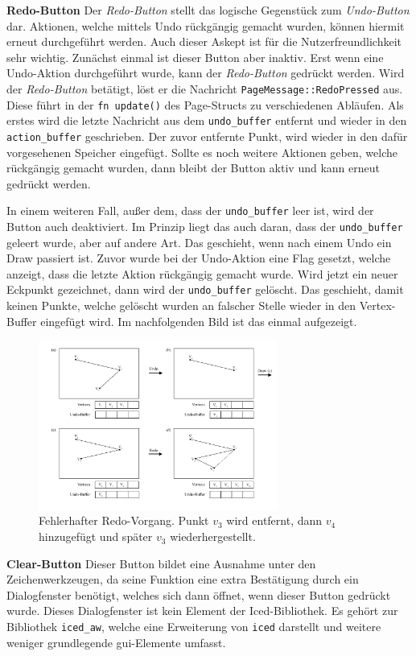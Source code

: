 \textbf{\small{Redo-Button}}\linebreak
Der \emph{Redo-Button} stellt das logische Gegenstück zum \emph{Undo-Button} dar. Aktionen, welche mittels Undo rückgängig gemacht wurden, können hiermit erneut durchgeführt werden. Auch dieser Askept ist für die Nutzerfreundlichkeit sehr wichtig.
Zunächst einmal ist dieser Button aber inaktiv. Erst wenn eine Undo-Aktion durchgeführt wurde, kann der \emph{Redo-Button} gedrückt werden.
Wird der \emph{Redo-Button} betätigt, löst er die Nachricht \lstinline{PageMessage::RedoPressed} aus. Diese führt in der \lstinline{fn update()} des Page-Structs zu verschiedenen Abläufen.
Als erstes wird die letzte Nachricht aus dem \lstinline{undo_buffer} entfernt und wieder in den \lstinline{action_buffer} geschrieben. Der zuvor entfernte Punkt, wird wieder in den dafür vorgesehenen Speicher eingefügt.
Sollte es noch weitere Aktionen geben, welche rückgängig gemacht wurden, dann bleibt der Button aktiv und kann erneut gedrückt werden.

In einem weiteren Fall, außer dem, dass der \lstinline{undo_buffer} leer ist, wird der Button auch deaktiviert. Im Prinzip liegt das auch daran, dass der \lstinline{undo_buffer} geleert wurde, aber auf andere Art.
Das geschieht, wenn nach einem Undo ein Draw passiert ist. Zuvor wurde bei der Undo-Aktion eine Flag gesetzt, welche anzeigt, dass die letzte Aktion rückgängig gemacht wurde. Wird jetzt ein neuer Eckpunkt gezeichnet, 
dann wird der \lstinline{undo_buffer} gelöscht. Das geschieht, damit keinen Punkte, welche gelöscht wurden an falscher Stelle wieder in den Vertex-Buffer eingefügt wird. Im nachfolgenden Bild ist das einmal aufgezeigt.
\pagebreak

\begin{figure}[t]
    \centering
    \includegraphics[width=0.7\textwidth]{bilder/falseRedo.png}
    \caption[Fehlerhafter Redo-Vorgang]{Fehlerhafter Redo-Vorgang. Punkt $v_3$ wird entfernt, dann $v_4$ hinzugefügt und später $v_3$ wiederhergestellt.}
\end{figure}
\textbf{\small{Clear-Button}}\linebreak
Dieser Button bildet eine Ausnahme unter den Zeichenwerkzeugen, da seine Funktion eine extra Bestätigung durch ein Dialogfenster benötigt, welches sich dann öffnet, wenn dieser Button gedrückt wurde. 
Dieses Dialogfenster ist kein Element der Iced-Bibliothek. Es gehört zur Bibliothek \lstinline{iced_aw}, welche eine Erweiterung von \lstinline{iced} darstellt und weitere weniger grundlegende \ac{gui}-Elemente umfasst.

